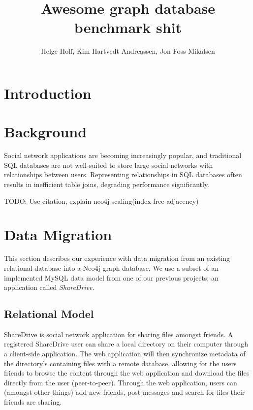 \documentclass[a4paper, 12pt, conference]{IEEEtran}
\newcommand{\todo}[1]{}
\renewcommand{\todo}[1]{{\color{blue} TODO:  {#1}}}
\def \thetitle {Awesome graph database benchmark shit}
\def \theauthor {Helge Hoff, Kim Hartvedt Andreassen, Jon Foss Mikalsen}
\begin{document}
\title{\thetitle}
\author{\theauthor}

\maketitle
\pagestyle{fancy}
 
\IEEEpeerreviewmaketitle

\section{Introduction}

\section{Background}
Social network applications are becoming increasingly popular, and traditional SQL databases are not well-suited to store large social networks with relationships between users.
Representing relationships in SQL databases often results in inefficient table joins, degrading performance significantly.
 
\todo{Use citation, explain neo4j scaling(index-free-adjacency)}
\cite{neo_scale}
\section{Data Migration}

This section describes our experience with data migration from an existing relational database into a Neo4j graph database. 
We use a subset of an implemented MySQL data model from one of our previous projects; an application called \textit{ShareDrive}.

\subsection{Relational Model} 
ShareDrive is social network application for sharing files amongst friends. 
A registered ShareDrive user can share a local directory on their computer through a client-side application. 
The web application will then synchronize metadata of the directory's containing files with a remote database, allowing for the users friends to browse the content through the web application and download the files directly from the user (peer-to-peer). 
Through the web application, users can (amongst other things) add new friends, post messages and search for files their friends are sharing.
\end{document}
